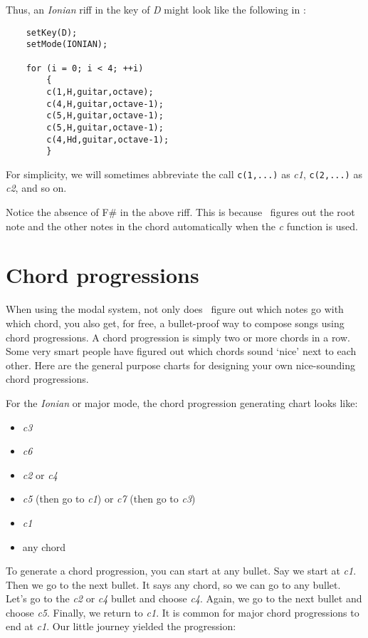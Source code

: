 \documentclass{article}
\begin{document}
Thus, an {\it Ionian} riff in the key of {\it D} might look like the
following in \songlib:

\begin{verbatim}
    setKey(D);
    setMode(IONIAN);

    for (i = 0; i < 4; ++i)
        {
        c(1,H,guitar,octave);
        c(4,H,guitar,octave-1);
        c(5,H,guitar,octave-1);
        c(5,H,guitar,octave-1);
        c(4,Hd,guitar,octave-1);
        }
\end{verbatim}

For simplicity, we will sometimes abbreviate the call \verb!c(1,...)! as 
{\it c1}, \verb!c(2,...)! as {\it c2}, and so on.

Notice the absence of F\# in the above riff. This is because \songlib\ figures
out the root note and the other notes in the chord automatically when the
{\it c} function is used.

\section*{Chord progressions}

When using the modal system, not only does \songlib\ figure out which notes go
with which chord, you also get, for free, a bullet-proof way to compose songs using chord progressions.
A chord progression is simply two or more chords in a row. Some very smart
people have figured out which chords sound `nice' next to each other. Here
are the general purpose charts for designing your own nice-sounding chord
progressions.

For the {\it Ionian} or major mode, the chord progression generating chart looks
like:

\begin{itemize}
\item
        {\it c3}
\item
        {\it c6}
\item
        {\it c2} or {\it c4}
\item
        {\it c5} (then go to {\it c1}) or {\it c7} (then go to {\it c3})
\item
        {\it c1}
\item
        any chord
\end{itemize}

To generate a chord progression, you can start at any bullet.
Say we start at {\it c1}. Then we go to the next bullet. It says
any chord, so we can go to any bullet. Let's go to the
{\it c2} or {\it c4}
bullet and choose {\it c4}. Again, we go to the next bullet 
and choose {\it c5}. Finally, we return to {\it c1}.
It is common for major chord progressions to end at {\it c1}.
Our little journey yielded the progression:
\end{document}
